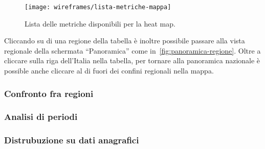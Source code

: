 \begin{figure}[H]
    \centering
    \texttt{[image: wireframes/lista-metriche-mappa]}
    \caption{Lista delle metriche disponibili per la heat map.}
    \label{fig:lista-metriche-mappa}
\end{figure}

Cliccando su di una regione della tabella è inoltre possibile passare alla vista regionale della schermata ``Panoramica'' come in~\ref{fig:panoramica-regione}. Oltre a cliccare sulla riga dell'Italia nella tabella, per tornare alla panoramica nazionale è possible anche cliccare al di fuori dei confini regionali nella mappa.

\subsubsection{Confronto fra regioni}\label{ss:confronto-fra-regioni}

\subsubsection{Analisi di periodi}\label{ss:analisi-di-periodi}

\subsubsection{Distrubuzione su dati anagrafici}\label{ss:distribuzione-su-dati-anagrafici}
